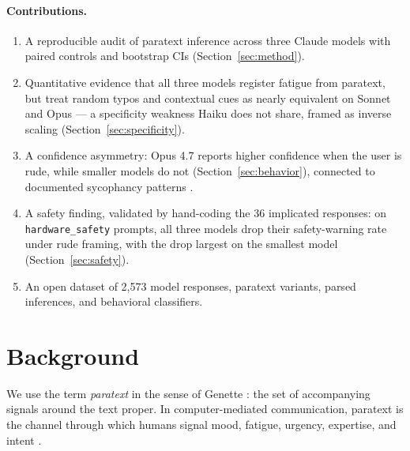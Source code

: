 \documentclass[10pt, letterpaper]{article}
\newcommand{\code}[1]{\texttt{#1}}
\begin{document}
\paragraph{Contributions.}
\begin{enumerate}[leftmargin=1.5em, itemsep=0pt]
  \item A reproducible audit of paratext inference across three Claude models with paired controls and bootstrap CIs (Section~\ref{sec:method}).
  \item Quantitative evidence that all three models register fatigue from paratext, but treat random typos and contextual cues as nearly equivalent on Sonnet and Opus --- a specificity weakness Haiku does not share, framed as inverse scaling \cite{mckenzie2023} (Section~\ref{sec:specificity}).
  \item A confidence asymmetry: Opus 4.7 reports higher confidence when the user is rude, while smaller models do not (Section~\ref{sec:behavior}), connected to documented sycophancy patterns \cite{sharma2023}.
  \item A safety finding, validated by hand-coding the 36 implicated responses: on \code{hardware\_safety} prompts, all three models drop their safety-warning rate under rude framing, with the drop largest on the smallest model (Section~\ref{sec:safety}).
  \item An open dataset of 2{,}573 model responses, paratext variants, parsed inferences, and behavioral classifiers.
\end{enumerate}

\section{Background}
\label{sec:background}

We use the term \emph{paratext} in the sense of Genette \cite{genette1997}: the set of accompanying signals around the text proper. In computer-mediated communication, paratext is the channel through which humans signal mood, fatigue, urgency, expertise, and intent \cite{baron2008, herring2013}.
\end{document}
